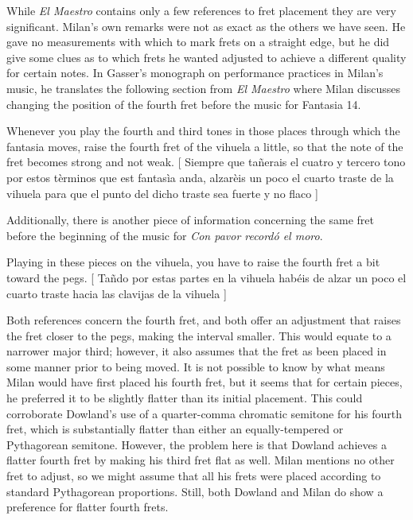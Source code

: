 While \textit{El Maestro} contains only a few references to fret placement they are
very significant.  Milan's own remarks were not as exact as the others we have
seen.  He gave no measurements with which to mark frets on a straight edge, but he
did give some clues as to which frets he wanted adjusted to achieve a different
quality for certain notes.  In Gasser's monograph on performance practices in Milan's
music, he translates the following section from \textit{El Maestro} where Milan
discusses changing the position of the fourth fret before the music for Fantasia 14.
\begin{blocks}
Whenever you play the fourth and third tones in those places through which the fantasia
moves, raise the fourth fret of the vihuela a little, so that the note of the fret
becomes strong and not weak.
[ Siempre que ta\~{n}erais el cuatro y tercero tono por estos t\`{e}rminos que est
fantas\`{i}a anda, alzar\`{e}is un poco el cuarto traste de la vihuela para que el
punto del dicho traste sea fuerte y no flaco ]\autocite[156]{LG:1}
\end{blocks}
Additionally, there is another piece of information concerning the same fret before the
beginning of the music for \textit{Con pavor record\'{o} el moro}.
\begin{blocks}
Playing in these pieces on the vihuela, you have to raise the fourth fret a bit toward
the pegs.
[ Ta\~{n}do por estas partes en la vihuela hab\'{e}is de alzar un poco el
cuarto traste hacia las clavijas de la vihuela ]\autocite[156]{LG:1}
\end{blocks}
Both references concern the fourth fret, and both offer an adjustment that raises the
fret closer to the pegs, making the interval smaller.  This would equate to a narrower
major third; however, it also assumes that the fret as been placed in some manner prior
to being moved.  It is not possible to know by what means Milan would have first placed
his fourth fret, but it seems that for certain pieces, he preferred it
to be slightly flatter than its initial placement.  This could corroborate Dowland's
use of a quarter-comma chromatic semitone for his fourth fret, which is substantially
flatter than either an equally-tempered or Pythagorean semitone.  However, the problem
here is that Dowland achieves a flatter fourth fret by making his third fret flat
as well.  Milan mentions no other fret to adjust, so we might assume that all his frets
were placed according to standard Pythagorean proportions.  Still, both Dowland and
Milan do show a preference for flatter fourth frets.

